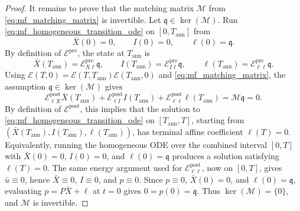 \documentclass[10pt,a4paper]{amsart}
\begin{document}
\begin{proof}
It remains to prove that the matching matrix \(\mathcal M\)
from \eqref{eq:mf_matching_matrix} is invertible.
Let \(\mathfrak q\in\ker(\mathcal M)\). Run
\eqref{eq:mf_homogeneous_transition_ode} on \([0,T_{\mathrm{ann}}]\) from
\[
\bar X(0)=0,
\qquad
I(0)=0,
\qquad
\ell(0)=\mathfrak q.
\]
By definition of \(\mathcal E^{\mathrm{pre}}\), the state at \(T_{\mathrm{ann}}\) is
\[
\bar X(T_{\mathrm{ann}})=\mathcal E^{\mathrm{pre}}_{X\ell}\mathfrak q,
\qquad
I(T_{\mathrm{ann}})=\mathcal E^{\mathrm{pre}}_{I\ell}\mathfrak q,
\qquad
\ell(T_{\mathrm{ann}})=\mathcal E^{\mathrm{pre}}_{\ell\ell}\mathfrak q.
\]
Using
\(\mathcal E(T,0)=\mathcal E(T,T_{\mathrm{ann}})
\mathcal E(T_{\mathrm{ann}},0)\) and
\eqref{eq:mf_matching_matrix}, the assumption
\(\mathfrak q\in\ker(\mathcal M)\) gives
\[
\mathcal E^{\mathrm{post}}_{\ell X}\bar X(T_{\mathrm{ann}})
+
\mathcal E^{\mathrm{post}}_{\ell I}I(T_{\mathrm{ann}})
+
\mathcal E^{\mathrm{post}}_{\ell\ell}\ell(T_{\mathrm{ann}})
=\mathcal M\mathfrak q
=0.
\]
By definition of \(\mathcal E^{\mathrm{post}}\), this implies that the solution to
\eqref{eq:mf_homogeneous_transition_ode} on
\([T_{\mathrm{ann}},T]\), starting from
\((\bar X(T_{\mathrm{ann}}),I(T_{\mathrm{ann}}),\ell(T_{\mathrm{ann}}))\), has terminal
affine coefficient \(\ell(T)=0\). Equivalently, running the homogeneous ODE over
the combined interval \([0,T]\) with \(\bar X(0)=0\), \(I(0)=0\), and
\(\ell(0)=\mathfrak q\)
produces a solution satisfying \(\ell(T)=0\). The same energy argument used for
\(\mathcal E^{\mathrm{post}}_{\ell\ell}\), now on \([0,T]\), gives
\(\bar u\equiv0\), hence \(\bar X\equiv0\), \(I\equiv0\), and
\(p\equiv0\).
Since \(p\equiv0\), \(\bar X(0)=0\), and \(\ell(0)=\mathfrak q\), evaluating
\(p=P\bar X+\ell\) at \(t=0\) gives
\(0=p(0)=\mathfrak q\). Thus
\(\ker(\mathcal M)=\{0\}\), and \(\mathcal M\) is invertible.
\end{proof}
\end{document}
